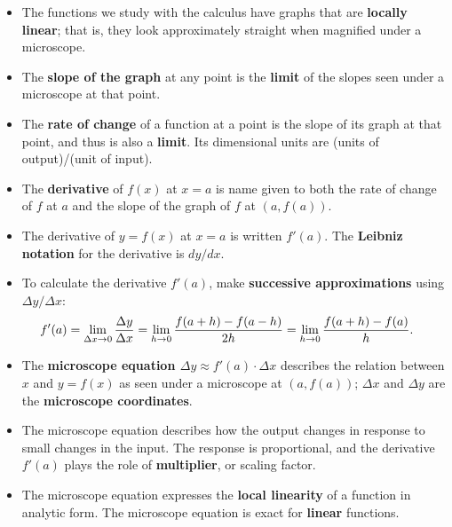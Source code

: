 \begin{itemize}

\item The functions we study with the calculus have graphs that are
  {\bf locally linear}; that is, they look approximately straight when
  magnified under a microscope.

\item The {\bf slope of the graph} at any point is the {\bf limit} of
  the slopes seen under a microscope at that point.

\item The {\bf rate of change} of a function at a point is the slope
  of its graph at that point, and thus is also a {\bf limit}.  Its
  dimensional units are (units of output)/(unit of input).

\item The {\bf derivative} of $f(x)$ at $x = a$ is name given to both
  the rate of change of $f$ at $a$ and the slope of the graph of $f$
  at $(a, f(a))$.

\item The derivative of $y = f(x)$ at $x = a$ is written {\bf
  \boldmath $f'(a)$}.  The {\bf Leibniz notation} for the derivative
  is {\bf \boldmath $dy/dx$}.

\item To calculate the derivative $f'(a)$, make {\bf successive
  approximations} using $\Delta y/\Delta x$:
	\[
\hspace{-14pt} f'(a) = \lim_{\Delta x \to 0}
		\frac{\Delta y}{\Delta x}
		= \lim_{h \to 0}{\frac{f(a+h) - f(a-h)}{2h}} =
		\lim_{h \to 0}\dfrac{f(a + h) - f(a)}{h}.
\]

\item The {\bf microscope equation \boldmath $\Delta y \approx f'(a)
  \! \cdot \! \Delta x$} describes the relation between $x$ and $y =
  f(x)$ as seen under a microscope at $(a, f(a))$; {\bf \boldmath
    $\Delta x$} and {\bf \boldmath $\Delta y$} are the {\bf microscope
    coordinates}.

\item The microscope equation describes how the output changes in
  response to small changes in the input.  The response is
  proportional, and the derivative $f'(a)$ plays the role of {\bf
    multiplier}, or scaling factor.

\item The microscope equation expresses the {\bf local linearity} of a
  function in analytic form.  The microscope equation is exact for
  {\bf linear} functions.


\end{itemize}
